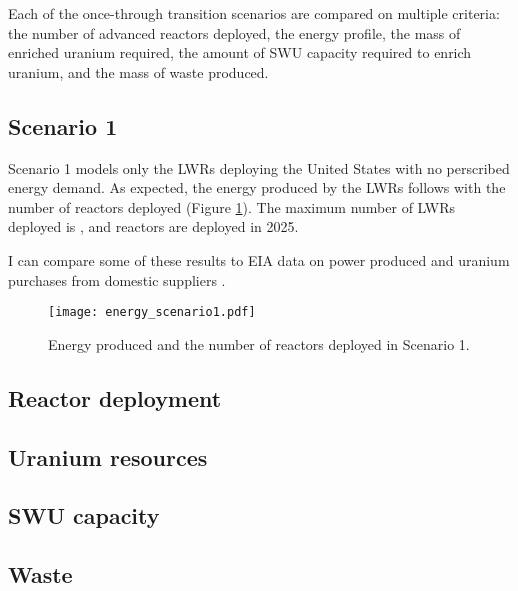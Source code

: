 
Each of the once-through transition scenarios are compared on multiple 
criteria: the number of advanced reactors deployed, the energy profile, 
the mass of enriched 
uranium required, the amount of \gls{SWU} capacity required to enrich uranium,
and the mass of waste produced. 

\subsection{Scenario 1}
Scenario 1 models only the \glspl{LWR} deploying the United States with no 
perscribed energy demand. As expected, the energy 
produced by the \glspl{LWR} follows with the number of reactors deployed
(Figure \ref{fig:energy1}). The maximum number of \glspl{LWR} deployed is 
, and reactors are deployed in 2025. 

I can compare some of these results to EIA data on power produced and 
uranium purchases from domestic suppliers \cite{us_eia_monthly_2022}.

\begin{figure}
    \centering
    \texttt{[image: energy\_scenario1.pdf]}
    \caption{Energy produced and the number of reactors deployed in Scenario 1.}
    \label{fig:energy1}
\end{figure}

\subsection{Reactor deployment}

\subsection{Uranium resources}

\subsection{SWU capacity}

\subsection{Waste}